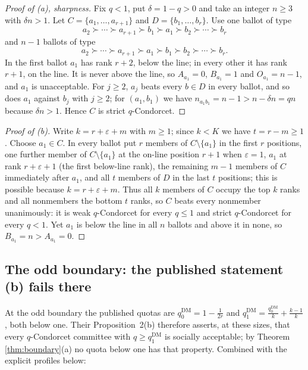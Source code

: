 \documentclass[11pt]{article}
\theoremstyle{plain}
\theoremstyle{definition}
\newcommand{\eps}{\varepsilon}
\newcommand{\DM}{\mathrm{DM}}
\begin{document}
\begin{proof}[Proof of (a), sharpness]
Fix $q<1$, put $\delta=1-q>0$ and take an integer $n\ge3$ with $\delta n>1$. Let $C=\{a_1,\dots,a_{r+1}\}$ and $D=\{b_1,\dots,b_r\}$. Use one ballot of type
\[
a_2\succ\cdots\succ a_{r+1}\succ b_1\succ a_1\succ b_2\succ\cdots\succ b_r
\]
and $n-1$ ballots of type
\[
a_2\succ\cdots\succ a_{r+1}\succ a_1\succ b_1\succ b_2\succ\cdots\succ b_r .
\]
In the first ballot $a_1$ has rank $r+2$, below the line; in every other it has rank $r+1$, on the line. It is never above the line, so $A_{a_1}=0$, $B_{a_1}=1$ and $O_{a_1}=n-1$, and $a_1$ is unacceptable. For $j\ge2$, $a_j$ beats every $b\in D$ in every ballot, and so does $a_1$ against $b_j$ with $j\ge2$; for $(a_1,b_1)$ we have $n_{a_1b_1}=n-1>n-\delta n=qn$ because $\delta n>1$. Hence $C$ is strict $q$-Condorcet.
\end{proof}

\begin{proof}[Proof of (b)]
Write $k=r+\eps+m$ with $m\ge1$; since $k<K$ we have $t=r-m\ge1$. Choose $a_1\in C$. In every ballot put $r$ members of $C\setminus\{a_1\}$ in the first $r$ positions, one further member of $C\setminus\{a_1\}$ at the on-line position $r+1$ when $\eps=1$, $a_1$ at rank $r+\eps+1$ (the first below-line rank), the remaining $m-1$ members of $C$ immediately after $a_1$, and all $t$ members of $D$ in the last $t$ positions; this is possible because $k=r+\eps+m$. Thus all $k$ members of $C$ occupy the top $k$ ranks and all nonmembers the bottom $t$ ranks, so $C$ beats every nonmember unanimously: it is weak $q$-Condorcet for every $q\le1$ and strict $q$-Condorcet for every $q<1$. Yet $a_1$ is below the line in all $n$ ballots and above it in none, so $B_{a_1}=n>A_{a_1}=0$.
\end{proof}

\subsection{The odd boundary: the published statement (b) fails there}
\label{sec:boundaryfalse}

At the odd boundary the published quotas are $q_0^{\DM}=1-\frac{1}{2r}$ and $q_1^{\DM}=\frac{q_0^{\DM}}{k}+\frac{k-1}{k}$, both below one. Their Proposition~2(b) therefore asserts, at these sizes, that every $q$-Condorcet committee with $q\ge q_1^{\DM}$ is socially acceptable; by Theorem \ref{thm:boundary}(a) no quota below one has that property. Combined with the explicit profiles below:
\end{document}
